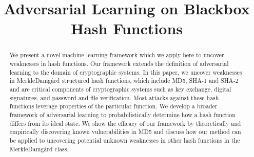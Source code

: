 \documentclass[letterpaper,twocolumn,10pt]{article}
\begin{document}

\date{}

\title{\Large \bf Adversarial Learning on Blackbox Hash Functions}


\maketitle

\begin{abstract}
We present a novel machine learning framework which we apply here to uncover weaknesses in hash functions. Our framework extends the definition of adversarial learning to the domain of cryptographic systems. In this paper, we uncover weaknesses in Merkle{\textendash}Damg\r{a}rd structured hash functions, which include MD5, SHA-1 and SHA-2 and are critical components of cryptographic systems such as key exchange, digital signatures, and password and file verification. Most attacks against these hash functions leverage properties of the particular function. We develop a broader framework of adversarial learning to probabilistically determine how a hash function differs from its ideal state. We show the efficacy of our framework by theoretically and empirically discovering known vulnerabilities in MD5 and discuss how our method can be applied to uncovering potential unknown weaknesses in other hash functions in the Merkle{\textendash}Damg\r{a}rd class.
\end{abstract}

\end{document}
